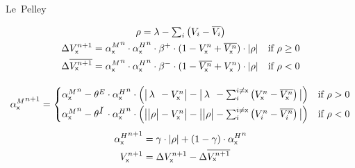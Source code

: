 \documentclass[border=10pt,varwidth]{standalone}
\begin{document}
\newcommand{\eks}{\textsf{x}}
\newcommand{\longlambda}{\rlap{$\,\lambda$}\phantom{\big| \rho \big|}}
\newcommand{\longI}{\rlap{$I$}\phantom{E}}

\begin{center}
	\huge
	\sffamily
	Le~Pelley
\end{center}

\begin{gather*}
	\begin{gathered}
		\rho = \lambda - \textstyle\sum_i \left( V_i - \overline{V_i} \right) \\
		\begin{aligned}
			\Delta V_\eks^{n + 1} &= {\alpha^M_\eks}^n \cdot {\alpha^H_\eks}^n \cdot \beta^+ \cdot (1 - V_\eks^n + \overline{V_\eks^n}) \cdot \left| \rho \right| & \text{if } \rho \geq 0 \\
			 \Delta \overline{V_\eks^{n + 1}} &= {\alpha^M_\eks}^n \cdot {\alpha^H_\eks}^n \cdot \beta^- \cdot (1 - \overline{V_\eks^n} + V_\eks^n) \cdot \left| \rho \right| & \text{if } \rho < 0
		\end{aligned}
	\end{gathered} \\[1em]
	\begin{gathered}
		{\alpha^M_\eks}^{n + 1} =
			\begin{cases}
				{\alpha^M_\eks}^n - \theta^E \cdot {\alpha^H_\eks}^n \cdot \left( \big| \longlambda - V_\eks^n \big| - \big| \longlambda - \textstyle\sum_i^{i \neq \eks} \left( V_\eks^n - \overline{V_\eks^n} \right) \big| \right) & \text{if } \rho > 0 \\[1ex]
				 {\alpha^M_\eks}^n -\theta^{\longI} \cdot {\alpha^H_\eks}^n \cdot \left( \big| \big| \rho \big| - V_\eks^n \big| - \big| \big| \rho \big| - \textstyle\sum_i^{i \neq \eks} \left( V_i^n - \overline{V_i^n} \right) \big| \right) & \text{if } \rho < 0
			\end{cases} \\[1ex]
			\begin{aligned}
				{\alpha^H_\eks}^{n + 1} &= \gamma \cdot \left| \rho \right| + \left( 1 - \gamma \right) \cdot {\alpha^H_\eks}^{n} \\
				V_\eks^{n + 1} &= \Delta V_\eks^{n + 1} - \Delta \overline{V_\eks^{n + 1}}
			\end{aligned}
	\end{gathered}
\end{gather*}

\nocite{LePelley2004}

\end{document}
